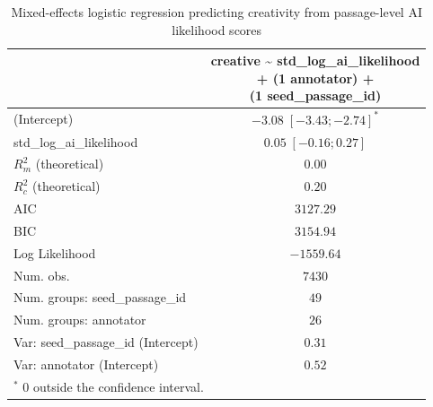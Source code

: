 
\usepackage{booktabs}

\begin{table}[htbp]
\begin{center}
\begin{tabular}{l c}
\toprule
 & \shortstack[l]{creative \textasciitilde{} std\_log\_ai\_likelihood  \\ 
+ (1 \textbar{} annotator) + \\ 
(1 \textbar{} seed\_passage\_id)} \\
\midrule
(Intercept)                        & $-3.08 \; [-3.43; -2.74]^{*}$ \\
std\_log\_ai\_likelihood           & $0.05 \; [-0.16;  0.27]$      \\
\midrule
$R^2_m$ (theoretical)              & $0.00$                        \\
$R^2_c$ (theoretical)              & $0.20$                        \\
AIC                                & $3127.29$                     \\
BIC                                & $3154.94$                     \\
Log Likelihood                     & $-1559.64$                    \\
Num. obs.                          & $7430$                        \\
Num. groups: seed\_passage\_id     & $49$                          \\
Num. groups: annotator             & $26$                          \\
Var: seed\_passage\_id (Intercept) & $0.31$                        \\
Var: annotator (Intercept)         & $0.52$                        \\
\bottomrule
\multicolumn{2}{l}{\scriptsize{$^*$ 0 outside the confidence interval.}}
\end{tabular}
\caption{Mixed-effects logistic regression predicting creativity from passage-level AI likelihood scores}
\label{tab:glmer_nov_ail}
\end{center}
\end{table}
